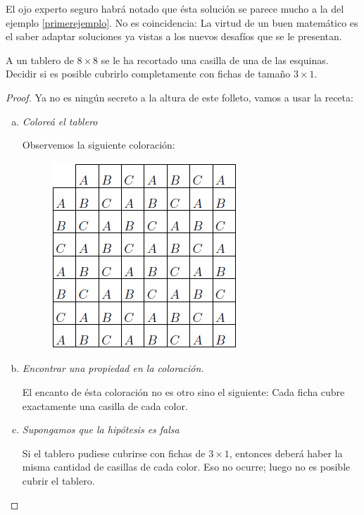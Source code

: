 El ojo experto seguro habr\'a notado que \'esta soluci\'on se parece mucho a la del ejemplo \ref{primerejemplo}. No es coincidencia: La virtud de un buen matem\'atico es el saber adaptar soluciones ya vistas a los nuevos desaf\'ios que se le presentan.

\begin{ejem}
	A un tablero de $8 \times 8$ se le ha recortado una casilla de una de las esquinas. Decidir si es posible cubrirlo completamente con fichas de tamaño $3 \times 1$.
\end{ejem}

\begin{proof}
	
	Ya no es ning\'un secreto a la altura de este folleto, vamos a usar la receta:
	
	
	\begin{enumerate}[a.]
		
		\item \textit{Colore\'a el tablero}
		
		Observemos la siguiente coloraci\'on:
		
		\begin{figure}[h!]
			\centering
			\includegraphics[scale=.85]{imgs/color5.png}
		\end{figure}
		
		\item \textit{Encontrar una propiedad en la coloraci\'on.}
		
		El encanto de \'esta coloraci\'on no es otro sino el siguiente: Cada ficha cubre exactamente una casilla de cada color. 
		
		\item \textit{Supongamos que la hip\'otesis es falsa}
		
		Si el tablero pudiese cubrirse con fichas de $3 \times 1$, entonces deber\'a haber la misma cantidad de casillas de cada color. Eso no ocurre; luego no es posible cubrir el tablero. 
	\end{enumerate}
\end{proof}


